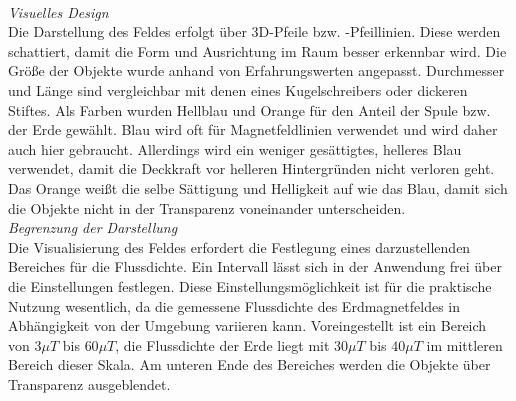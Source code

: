\vspace{4px}
\begin{center}
	\\
\end{center}
\vspace{6px}

\textit{Visuelles Design}\\
Die Darstellung des Feldes erfolgt über 3D-Pfeile bzw. -Pfeillinien. Diese werden schattiert, damit die Form und Ausrichtung im Raum besser erkennbar wird. Die Größe der Objekte wurde anhand von Erfahrungswerten angepasst. Durchmesser und Länge sind vergleichbar mit denen eines Kugelschreibers oder dickeren Stiftes. Als Farben wurden Hellblau und Orange für den Anteil der Spule bzw. der Erde gewählt. Blau wird oft für Magnetfeldlinien verwendet und wird daher auch hier gebraucht. Allerdings wird ein weniger gesättigtes, helleres Blau verwendet, damit die Deckkraft vor helleren Hintergründen nicht verloren geht. Das Orange weißt die selbe Sättigung und Helligkeit auf wie das Blau, damit sich die Objekte nicht in der Transparenz voneinander unterscheiden.\\

\textit{Begrenzung der Darstellung}\\
Die Visualisierung des Feldes erfordert die Festlegung eines darzustellenden Bereiches für die Flussdichte. Ein Intervall lässt sich in der Anwendung frei über die Einstellungen festlegen. Diese Einstellungsmöglichkeit ist für die praktische Nutzung wesentlich, da die gemessene Flussdichte des Erdmagnetfeldes in Abhängigkeit von der Umgebung variieren kann. Voreingestellt ist ein Bereich von $3\mu T$ bis $60\mu T$, die Flussdichte der Erde liegt mit $30 \mu T$ bis $40 \mu T$ im mittleren Bereich dieser Skala. Am unteren Ende des Bereiches werden die Objekte über Transparenz ausgeblendet.\\

